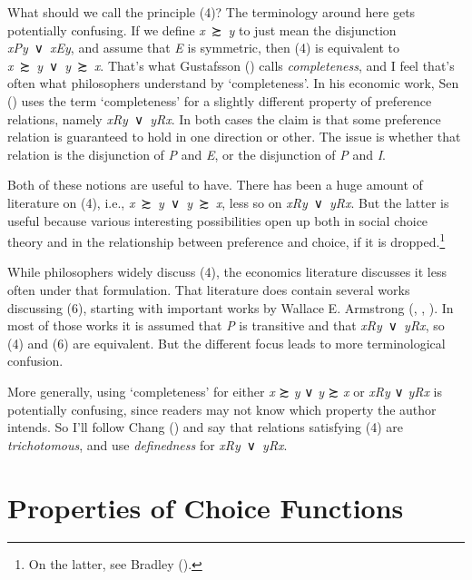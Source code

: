 \documentclass[
  11pt,
  letterpaper,
  DIV=11,
  numbers=noendperiod,
  twoside]{scrartcl}
\begin{document}
What should we call the principle (4)? The terminology around here gets
potentially confusing. If we define \emph{x}~≿~\emph{y} to just mean the
disjunction \emph{xPy}~∨~\emph{xEy}, and assume that \emph{E} is
symmetric, then (4) is equivalent to
\emph{x}~≿~\emph{y}~∨~\emph{y}~≿~\emph{x}. That's what Gustafsson
() calls \emph{completeness},
and I feel that's often what philosophers understand by `completeness'.
In his economic work, Sen ()
uses the term `completeness' for a slightly different property of
preference relations, namely \emph{xRy}~∨~\emph{yRx}. In both cases the
claim is that some preference relation is guaranteed to hold in one
direction or other. The issue is whether that relation is the
disjunction of \emph{P} and \emph{E}, or the disjunction of \emph{P} and
\emph{I}.

Both of these notions are useful to have. There has been a huge amount
of literature on (4), i.e., \emph{x}~≿~\emph{y}~∨~\emph{y}~≿~\emph{x},
less so on \emph{xRy}~∨~\emph{yRx}. But the latter is useful because
various interesting possibilities open up both in social choice theory
and in the relationship between preference and choice, if it is
dropped.\footnote{On the latter, see Bradley
  ().}

While philosophers widely discuss (4), the economics literature
discusses it less often under that formulation. That literature does
contain several works discussing (6), starting with important works by
Wallace E. Armstrong (,
, ).
In most of those works it is assumed that \emph{P} is transitive and
that \emph{xRy}~∨~\emph{yRx}, so (4) and (6) are equivalent. But the
different focus leads to more terminological confusion.

More generally, using `completeness' for either \emph{x} ≿ \emph{y} ∨
\emph{y} ≿ \emph{x} or \emph{xRy} ∨ \emph{yRx} is potentially confusing,
since readers may not know which property the author intends. So I'll
follow Chang () and say that relations
satisfying (4) are \emph{trichotomous}, and use \emph{definedness} for
\emph{xRy}~∨~\emph{yRx}.

\section{Properties of Choice Functions}\label{sec-properties}
\end{document}
